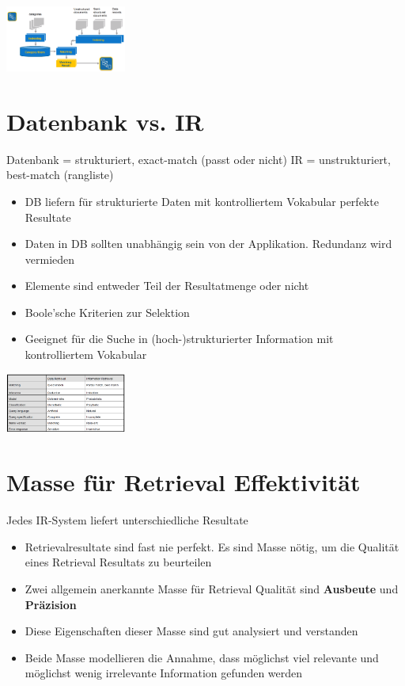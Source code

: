 \documentclass{report}
\newenvironment{Figure}
	{\par\medskip\noindent\minipage{\linewidth}}
	{\endminipage\par\medskip}
\theoremstyle{definition}
\theoremstyle{example}
\begin{document}
\begin{Figure}
   \centering
    \includegraphics[width=150px]{img/BrowseParadigma.png}
        \label{fig:Ablauf Browse}
\end{Figure}

\section{Datenbank vs. IR}
Datenbank = strukturiert, exact-match (passt oder nicht)
IR = unstrukturiert, best-match (rangliste)

\begin{itemize}
   \item DB liefern für strukturierte Daten mit kontrolliertem Vokabular perfekte Resultate
   \item Daten in DB sollten unabhängig sein von der Applikation. Redundanz wird vermieden
   \item Elemente sind entweder Teil der Resultatmenge oder nicht
   \item Boole'sche Kriterien zur Selektion
   \item Geeignet für die Suche in (hoch-)strukturierter Information mit kontrolliertem Vokabular
\end{itemize}

\begin{Figure}
   \centering
    \includegraphics[width=150px]{img/IRvsDB.png}
        \label{fig:Unterschied von IR vs DB}
\end{Figure}

\section{Masse für Retrieval Effektivität}
Jedes IR-System liefert unterschiedliche Resultate
\begin{itemize}
   \item Retrievalresultate sind fast nie perfekt. Es sind Masse nötig, um die Qualität eines Retrieval Resultats zu beurteilen
   \item Zwei allgemein anerkannte Masse für Retrieval Qualität sind \textbf{Ausbeute} und \textbf{Präzision}
   \item Diese Eigenschaften dieser Masse sind gut analysiert und verstanden
   \item Beide Masse modellieren die Annahme, dass möglichst viel relevante und möglichst wenig irrelevante Information gefunden werden
\end{itemize}
\end{document}
